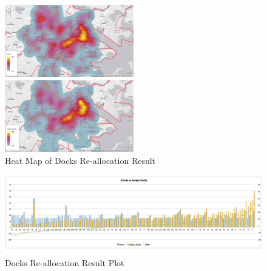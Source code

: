 \documentclass[journal, letterpaper]{IEEEtran}
\begin{document}
\begin{figure}
  \includegraphics[width=0.5\textwidth]{docksheat.jpg}
  
  \vspace{0.5cm}
  \includegraphics[width=0.5\textwidth]{assigndocksheat.jpg}
  \caption{Heat Map of Docks Re-allocation Result}
  \captionsetup{justification=centering}
  \label{fig:5}
\end{figure}

\begin{figure}
  \includegraphics[width=1\textwidth]{dockvsassigndock.jpg}
  \caption{Docks Re-allocation Result Plot}
  \label{fig:6}
\end{figure}
\end{document}
